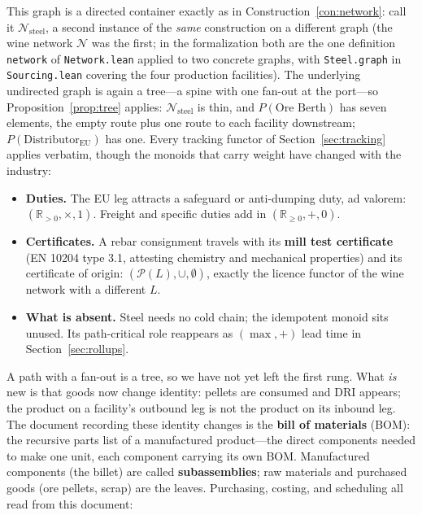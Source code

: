 \documentclass[11pt,a4paper]{article}
\newcommand{\N}{\mathcal{N}}
\theoremstyle{plain}
\theoremstyle{definition}
\theoremstyle{remark}
\begin{document}
This graph is a directed container exactly as in
Construction~\ref{con:network}: call it $\N_{\mathrm{steel}}$, a
second instance of the \emph{same} construction on a different graph
(the wine network $\N$ was the first; in the formalization both are
the one definition \texttt{network} of \texttt{Network.lean} applied
to two concrete graphs, with \texttt{Steel.graph} in
\texttt{Sourcing.lean} covering the four production facilities). The
underlying undirected graph is again a tree---a spine with one
fan-out at the port---so Proposition~\ref{prop:tree} applies:
$\N_{\mathrm{steel}}$ is thin, and $P(\text{Ore Berth})$ has seven
elements, the empty route plus one route to each facility
downstream; $P(\text{Distributor}_{\mathrm{EU}})$ has one. Every
tracking functor of Section~\ref{sec:tracking} applies verbatim,
though the monoids that carry weight have changed with the industry:
\begin{itemize}[nosep]
\item \textbf{Duties.} The EU leg attracts a safeguard or
  anti-dumping duty, ad valorem: $(\mathbb{R}_{>0}, \times, 1)$.
  Freight and specific duties add in $(\mathbb{R}_{\geq 0}, +, 0)$.
\item \textbf{Certificates.} A rebar consignment travels with its
  \textbf{mill test certificate} (EN 10204 type 3.1, attesting
  chemistry and mechanical properties) and its certificate of
  origin: $(\mathcal{P}(L), \cup, \emptyset)$, exactly the licence
  functor of the wine network with a different $L$.
\item \textbf{What is absent.} Steel needs no cold chain; the
  idempotent monoid sits unused. Its path-critical role reappears as
  $(\max, +)$ lead time in Section~\ref{sec:rollups}.
\end{itemize}
A path with a fan-out is a tree, so we have not yet left the
first rung. What \emph{is} new is
that goods now change identity: pellets are consumed and DRI
appears; the product on a facility's outbound leg is not the product
on its inbound leg. The document recording these identity changes is
the \textbf{bill of materials} (BOM): the recursive parts list of a
manufactured product---the direct components needed to make one
unit, each component carrying its own BOM. Manufactured components
(the billet) are called \textbf{subassemblies}; raw materials and
purchased goods (ore pellets, scrap) are the leaves. Purchasing,
costing, and scheduling all read from this document:

\begin{center}
\end{center}
\end{document}
